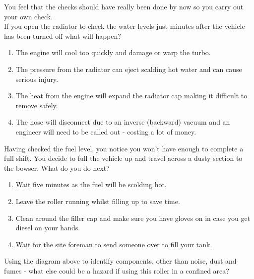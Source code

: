 \begin{exercise}
     You feel that the checks should have really been done by now so you carry out your own check. \\ If you open the radiator to check the water levels just minutes after the vehicle has been turned off what will happen?
\end{exercise}

 \begin{enumerate}[A] %
     \item The engine will cool too quickly and damage or warp the turbo.
     \item The pressure from the radiator can eject scalding hot water and can cause serious injury.
     \item The heat from the engine will expand the radiator cap making it difficult to remove safely.
     \item The hose will disconnect due to an inverse (backward) vacuum and an engineer will need to be called out - costing a lot of money.
 \end{enumerate}

\begin{exercise}
     Having checked the fuel level, you notice you won't have enough to complete a full shift. You decide to full the vehicle up and travel across a dusty section to the bowser. What do you do next? 
\end{exercise}

 \begin{enumerate}[A] %
     \item Wait five minutes as the fuel will be scolding hot.
     \item Leave the roller running whilst filling up to save time.
     \item Clean around the filler cap and make sure you have gloves on in case you get diesel on your hands.
     \item Wait for the site foreman to send someone over to fill your tank.
 \end{enumerate}

\begin{exercise}
    Using the diagram above to identify components, other than noise, dust and fumes - what else could be a hazard if using this roller in a confined area?
\end{exercise}
 \begin{Answer}
    \vspace{75pt}
 \end{Answer}
